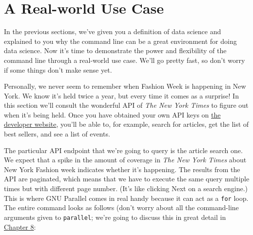 \documentclass[
]{book}
\newenvironment{Shaded}{\begin{snugshade}}{\end{snugshade}}
\newcommand{\BuiltInTok}[1]{#1}
\newcommand{\DataTypeTok}[1]{\textcolor[rgb]{0.13,0.29,0.53}{#1}}
\newcommand{\ExtensionTok}[1]{#1}
\newcommand{\NormalTok}[1]{#1}
\newcommand{\OperatorTok}[1]{\textcolor[rgb]{0.81,0.36,0.00}{\textbf{#1}}}
\newcommand{\StringTok}[1]{\textcolor[rgb]{0.31,0.60,0.02}{#1}}
\theoremstyle{definition}
\theoremstyle{definition}
\theoremstyle{definition}
\theoremstyle{remark}
\begin{document}
\hypertarget{a-real-world-use-case}{%
\section{A Real-world Use Case}\label{a-real-world-use-case}}

In the previous sections, we've given you a definition of data science and explained to you why the command line can be a great environment for doing data science. Now it's time to demonstrate the power and flexibility of the command line through a real-world use case. We'll go pretty fast, so don't worry if some things don't make sense yet.

Personally, we never seem to remember when Fashion Week is happening in New York. We know it's held twice a year, but every time it comes as a surprise! In this section we'll consult the wonderful API of \emph{The New York Times} to figure out when it's being held. Once you have obtained your own API keys on \href{http://developer.nytimes.com}{the developer website}, you'll be able to, for example, search for articles, get the list of best sellers, and see a list of events.

The particular API endpoint that we're going to query is the article search one. We expect that a spike in the amount of coverage in \emph{The New York Times} about New York Fashion week indicates whether it's happening. The results from the API are paginated, which means that we have to execute the same query multiple times but with different page number. (It's like clicking Next on a search engine.) This is where GNU Parallel \citep{parallel} comes in real handy because it can act as a \texttt{for} loop. The entire command looks as follows (don't worry about all the command-line arguments given to \texttt{parallel}; we're going to discuss this in great detail in \protect\hyperlink{parallel-pipelinesux5cux255D}{Chapter 8}:

\begin{Shaded}
\end{Shaded}
\end{document}
